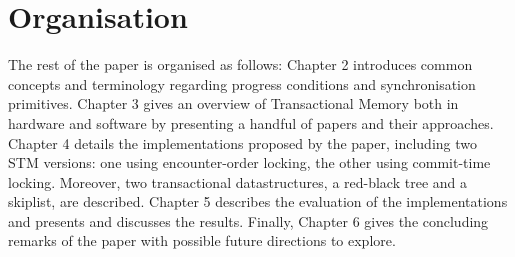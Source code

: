 \section{Organisation}
The rest of the paper is organised as follows: Chapter 2 introduces common concepts and terminology regarding progress conditions and synchronisation primitives. Chapter 3 gives an overview of Transactional Memory both in hardware and software by presenting a handful of papers and their approaches. Chapter 4 details the implementations proposed by the paper, including two STM versions: one using encounter-order locking, the other using commit-time locking. Moreover, two transactional datastructures, a red-black tree and a skiplist, are described. Chapter 5 describes the evaluation of the implementations and presents and discusses the results. Finally, Chapter 6 gives the concluding remarks of the paper with possible future directions to explore.